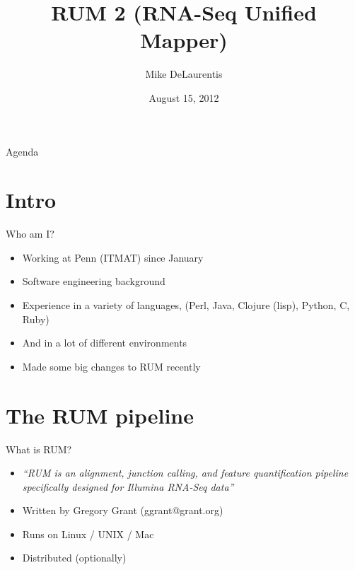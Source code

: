\documentclass{beamer}
\title[RUM 2]{RUM 2 (RNA-Seq Unified Mapper)}
\author{Mike DeLaurentis}
\institute{University of Pennsylvania}
\date{August 15, 2012}
\begin{document}
\begin{frame}
\titlepage
\end{frame}

\begin{frame}{Agenda}
  \tableofcontents
\end{frame}

\section{Intro}

\begin{frame}{Who am I?}
  \begin{itemize}
  \item Working at Penn (ITMAT) since January
  \item Software engineering background
  \item Experience in a variety of languages, (Perl, Java, Clojure (lisp), Python, C, Ruby)
  \item And in a lot of different environments
  \item Made some big changes to RUM recently
  \end{itemize}
\end{frame}

\section{The RUM pipeline}

\begin{frame}{What is RUM?}
  \begin{itemize}
  \item \textit{``RUM is an alignment, junction calling, and feature quantification pipeline specifically designed for Illumina RNA-Seq data''}
  \item Written by Gregory Grant (ggrant@grant.org)
  \item Runs on Linux / UNIX / Mac
  \item Distributed (optionally)
  \end{itemize}
\end{frame}
\end{document}
